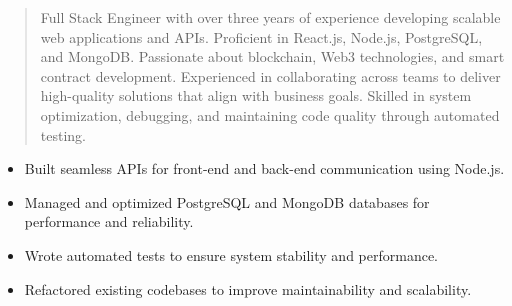 



\makecvheader

\begin{quote}
  \noindent
  Full Stack Engineer with over three years of experience developing scalable web applications and APIs. Proficient in React.js, Node.js, PostgreSQL, and MongoDB. Passionate about blockchain, Web3 technologies, and smart contract development. Experienced in collaborating across teams to deliver high-quality solutions that align with business goals. Skilled in system optimization, debugging, and maintaining code quality through automated testing.
\end{quote}

\par\smallskip
\noindent
\begin{minipage}{20cm}
  \begin{minipage}{9.75cm}
    \begin{itemize}
      \item Built seamless APIs for front-end and back-end communication using Node.js.
      \item Managed and optimized PostgreSQL and MongoDB databases for performance and reliability.
    \end{itemize}
  \end{minipage}
  \hfill
  \begin{minipage}{9.75cm}
    \begin{itemize}
      \item Wrote automated tests to ensure system stability and performance.
      \item Refactored existing codebases to improve maintainability and scalability.
    \end{itemize}
  \end{minipage}
\end{minipage}
\par\smallskip
\divider

